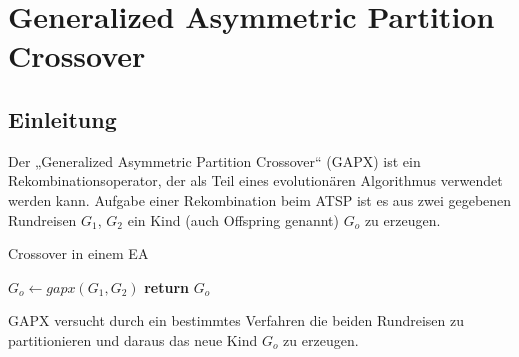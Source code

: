 \chapter{Generalized Asymmetric Partition Crossover}

\section{Einleitung}
Der „Generalized Asymmetric Partition Crossover“ (GAPX) ist ein
Rekombinationsoperator, der als Teil eines evolutionären Algorithmus
verwendet werden kann. Aufgabe einer Rekombination beim ATSP ist es aus
zwei gegebenen Rundreisen $G_1$, $G_2$ ein Kind (auch Offspring genannt)
$G_o$ zu erzeugen.


\begin{algorithm}
\caption{Crossover in einem EA}\label{alg:crossover_ea}
\begin{algorithmic}[1]
\Comment{}
\State $G_o\gets gapx(G_1,G_2)$
\State \textbf{return} $G_o$
\EndProcedure
\end{algorithmic}
\end{algorithm}
GAPX versucht durch ein bestimmtes Verfahren die beiden Rundreisen zu
partitionieren und daraus das neue Kind $G_o$ zu erzeugen.


